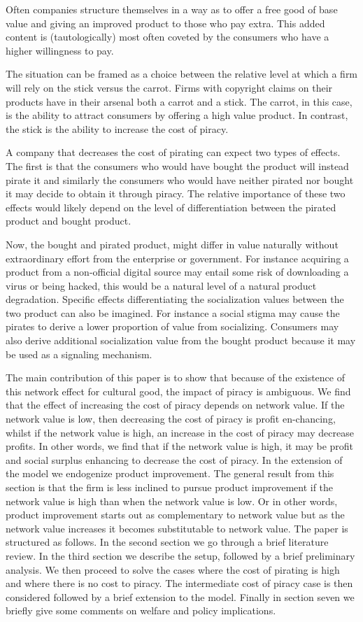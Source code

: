 \documentclass[12pt]{article}
\numberwithin{equation}{section}
\begin{document}
Often companies structure themselves in a way as to offer a free good of base value and giving an improved product to those who pay extra. This added content is (tautologically) most often coveted by the consumers who have a higher willingness to pay.

The situation can be framed as a choice between the relative level at which a firm will rely on the stick versus the carrot. Firms with copyright claims on their products have in their arsenal both a carrot and a stick. The carrot, in this case, is the ability to attract consumers by offering a high value product. In contrast, the stick is the ability to increase the cost of piracy.

A company that decreases the cost of pirating can expect two types of effects. The first is that the consumers who would have bought the product will instead pirate it and similarly the consumers who would have neither pirated nor bought it may decide to obtain it through piracy. The relative importance of these two effects would likely depend on the level of differentiation between the pirated product and bought product.

Now, the bought and pirated product, might differ in value naturally without extraordinary effort from the enterprise or government. For instance acquiring a product from a non-official digital source may entail some risk of downloading a virus or being hacked, this would be a natural level of a natural product degradation. Specific effects differentiating the socialization values between the two product can also be imagined. For instance a social stigma may cause the pirates to derive a lower proportion of value from socializing. Consumers may also derive additional socialization value from the bought product because it may be used as a signaling mechanism.

The main contribution of this paper is to show that because of the existence of this network effect for cultural good, the impact of piracy is ambiguous. We find that the effect of increasing the cost of piracy depends on network value. If the network value is low, then decreasing the cost of piracy is profit en-chancing, whilst if the network value is high, an increase in the cost of piracy may decrease profits. In other words, we find that if the network value is high, it may be profit and social surplus enhancing to decrease the cost of piracy. In the extension of the model we endogenize product improvement. The general result from this section is that the firm is less inclined to pursue product improvement if the network value is high than when the network value is low. Or in other words, product improvement starts out as complementary to network value but as the network value increases it becomes substitutable to network value.  The paper is structured as follows. In the second section we go through a brief literature review. In the third section we describe the setup, followed by a brief preliminary analysis. We then proceed to solve the cases where the cost of pirating is high and where there is no cost to piracy. The intermediate cost of piracy case is then considered followed by a brief extension to the model. Finally in section seven we briefly give some comments on welfare and policy implications.
\end{document}
